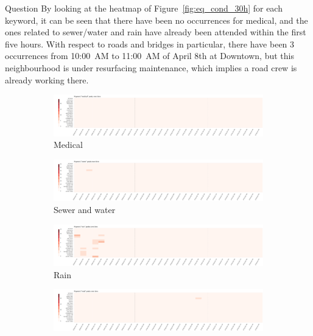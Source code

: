 \documentclass{article}
\begin{document}
\begin{section}{Question}
By looking at the heatmap of Figure~\ref{fig:eq_cond_30h} for each keyword, it
can be seen that there have been no occurrences for medical, and the ones
related to sewer/water and rain have already been attended within the first five
hours. With respect to roads and bridges in particular, there have been 3
occurrences from 10:00~AM to 11:00~AM of April 8th at Downtown, but this
neighbourhood is under resurfacing maintenance, which implies a road crew is
already working there.

\begin{figure}[!h]
    \centering
    \begin{subfigure}[!h]{0.48\textwidth}
        \centering
        \includegraphics[width=1.00\textwidth]{figs/cond_30h/cond_30h_medical.png}
        \caption{Medical}
    \end{subfigure}
    \begin{subfigure}[!h]{0.48\textwidth}
        \centering
        \includegraphics[width=1.00\textwidth]{figs/cond_30h/cond_30h_sewer.png}
        \caption{Sewer and water}
    \end{subfigure}
    \begin{subfigure}[!h]{0.48\textwidth}
        \centering
        \includegraphics[width=1.00\textwidth]{figs/cond_30h/cond_30h_rain.png}
        \caption{Rain}
    \end{subfigure}
    \begin{subfigure}[!h]{0.48\textwidth}
        \centering
        \includegraphics[width=1.00\textwidth]{figs/cond_30h/cond_30h_road.png}

\end{subfigure}
\end{figure}
\end{section}
\end{document}
